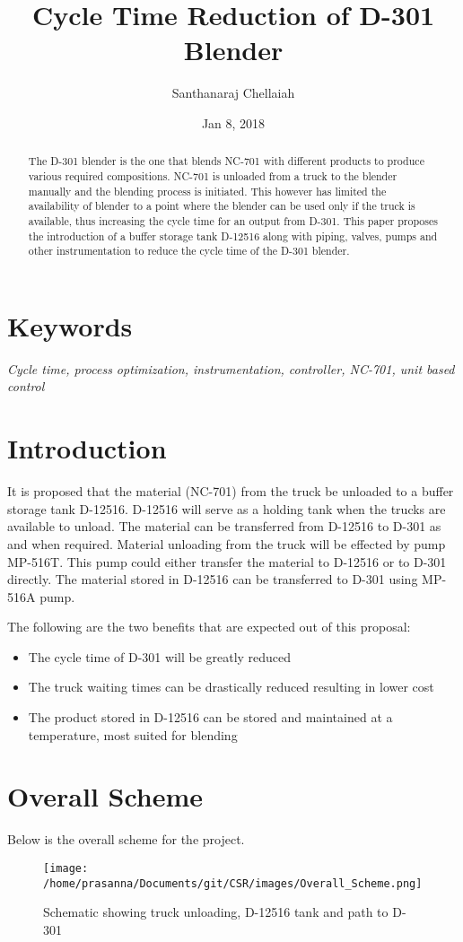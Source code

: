 \documentclass[a4paper,oneside]{article}
\author{Santhanaraj Chellaiah}
\date{Jan 8, 2018}
\title{Cycle Time Reduction of D-301 Blender}
\begin{document}
\maketitle
\begin{abstract}
The D-301 blender is the one that blends NC-701 with different
products to produce various required compositions. NC-701 is unloaded
from a truck to the blender manually and the blending process is
initiated. This however has limited the availability of blender to a
point where the blender can be used only if the truck is available,
thus increasing the cycle time for an output from D-301. This paper
proposes the introduction of a buffer storage tank D-12516 along with
piping, valves, pumps and other instrumentation to reduce the cycle
time of the D-301 blender.
\end{abstract}

\section{Keywords}
\label{sec:org753670d}
\emph{Cycle time, process optimization, instrumentation, controller, NC-701, unit based control}

\section{Introduction}
\label{sec:orga8b552e}
It is proposed that the material (NC-701) from the truck be unloaded
to a buffer storage tank D-12516. D-12516 will serve as a holding tank
when the trucks are available to unload. The material can be
transferred from D-12516 to D-301 as and when required. Material
unloading from the truck will be effected by pump MP-516T. This pump
could either transfer the material to D-12516 or to D-301
directly. The material stored in D-12516 can be transferred to D-301
using MP-516A pump.  

The following are the two benefits that are expected out of this proposal: 
\begin{itemize}
\item The cycle time of D-301 will be greatly reduced
\item The truck waiting times can be drastically reduced resulting in lower cost
\item The product stored in D-12516 can be stored and maintained at a
temperature, most suited for blending
\end{itemize}
\clearpage
\section{Overall Scheme}
\label{sec:orgc809cf8}
Below is the overall scheme for the project. 
\begin{figure}[htbp]
\centering
\texttt{[image: /home/prasanna/Documents/git/CSR/images/Overall\_Scheme.png]}
\caption{Schematic showing truck unloading, D-12516 tank and path to D-301}
\end{figure}
\end{document}
